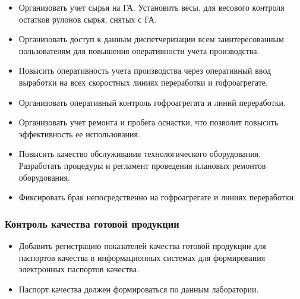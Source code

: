  \begin{itemize}
\item Организовать учет сырья на ГА. Установить весы, для весового контроля остатков рулонов сырья, снятых с ГА.
 \item Организовать доступ к данным диспетчеризации всем заинтересованным пользователям для повышения оперативности учета производства.
 \item Повысить оперативность учета производства через оперативный ввод выработки на всех скоростных линиях переработки и гофроагрегате.

 \item Организовать оперативный контроль гофроагрегата и линий переработки. 
\item Организовать учет ремонта и пробега оснастки, что позволит повысить эффективность ее использования. 
\item Повысить качество обслуживания технологического оборудования. Разработать процедуры и регламент проведения плановых ремонтов оборудования.
 \item Фиксировать брак непосредственно на гофроагрегате и линиях переработки.

 \end{itemize}

 \subsubsection{Контроль качества готовой продукции}

 \begin{itemize}

 \item Добавить регистрацию показателей качества готовой продукции для паспортов качества в информационных системах для формирования электронных паспортов качества.
 \item Паспорт качества должен формироваться по данным лаборатории.
\end{itemize}

